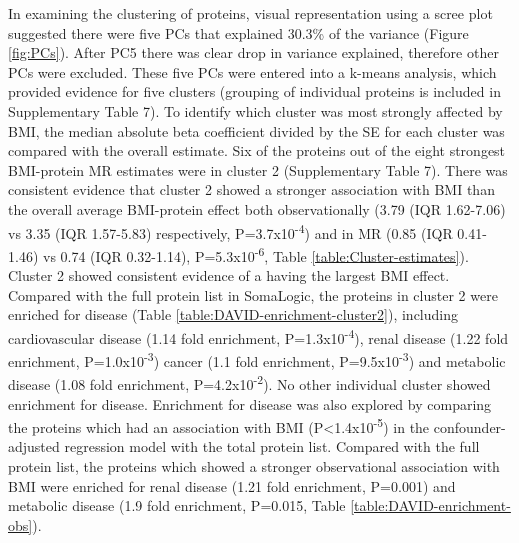 \documentclass[11pt,twoside]{bristolthesis}
\begin{document}
In examining the clustering of proteins, visual representation using a scree plot suggested there were five PCs that explained 30.3\% of the variance (Figure \ref{fig:PCs}). After PC5 there was clear drop in variance explained, therefore other PCs were excluded. These five PCs were entered into a k-means analysis, which provided evidence for five clusters (grouping of individual proteins is included in Supplementary Table 7). To identify which cluster was most strongly affected by BMI, the median absolute beta coefficient divided by the SE for each cluster was compared with the overall estimate. Six of the proteins out of the eight strongest BMI-protein MR estimates were in cluster 2 (Supplementary Table 7). There was consistent evidence that cluster 2 showed a stronger association with BMI than the overall average BMI-protein effect both observationally (3.79 (IQR 1.62-7.06) vs 3.35 (IQR 1.57-5.83) respectively, P=3.7x10\textsuperscript{-4}) and in MR (0.85 (IQR 0.41-1.46) vs 0.74 (IQR 0.32-1.14), P=5.3x10\textsuperscript{-6}, Table \ref{table:Cluster-estimates}). Cluster 2 showed consistent evidence of a having the largest BMI effect. Compared with the full protein list in SomaLogic, the proteins in cluster 2 were enriched for disease (Table \ref{table:DAVID-enrichment-cluster2}), including cardiovascular disease (1.14 fold enrichment, P=1.3x10\textsuperscript{-4}), renal disease (1.22 fold enrichment, P=1.0x10\textsuperscript{-3}) cancer (1.1 fold enrichment, P=9.5x10\textsuperscript{-3}) and metabolic disease (1.08 fold enrichment, P=4.2x10\textsuperscript{-2}). No other individual cluster showed enrichment for disease. Enrichment for disease was also explored by comparing the proteins which had an association with BMI (P\textless1.4x10\textsuperscript{-5}) in the confounder-adjusted regression model with the total protein list. Compared with the full protein list, the proteins which showed a stronger observational association with BMI were enriched for renal disease (1.21 fold enrichment, P=0.001) and metabolic disease (1.9 fold enrichment, P=0.015, Table \ref{table:DAVID-enrichment-obs}).
\end{document}
